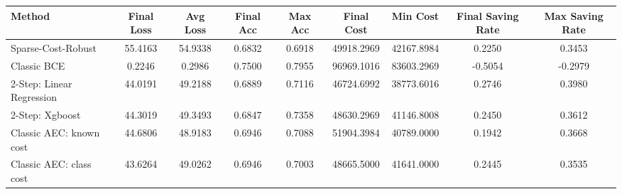 \begin{tabular}{lcccccccc}
\toprule
Method & Final Loss & Avg Loss & Final Acc & Max Acc & Final Cost & Min Cost & Final Saving Rate & Max Saving Rate \\
\midrule
Sparse-Cost-Robust & 55.4163 & 54.9338 & 0.6832 & 0.6918 & 49918.2969 & 42167.8984 & 0.2250 & 0.3453 \\
Classic BCE & 0.2246 & 0.2986 & 0.7500 & 0.7955 & 96969.1016 & 83603.2969 & -0.5054 & -0.2979 \\
2-Step: Linear Regression & 44.0191 & 49.2188 & 0.6889 & 0.7116 & 46724.6992 & 38773.6016 & 0.2746 & 0.3980 \\
2-Step: Xgboost & 44.3019 & 49.3493 & 0.6847 & 0.7358 & 48630.2969 & 41146.8008 & 0.2450 & 0.3612 \\
Classic AEC: known cost & 44.6806 & 48.9183 & 0.6946 & 0.7088 & 51904.3984 & 40789.0000 & 0.1942 & 0.3668 \\
Classic AEC: class cost & 43.6264 & 49.0262 & 0.6946 & 0.7003 & 48665.5000 & 41641.0000 & 0.2445 & 0.3535 \\
\bottomrule
\end{tabular}
